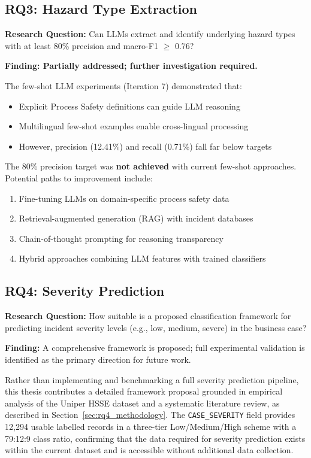 \documentclass[11pt, titlepage, bibliography=totoc]{scrreprt}
\begin{document}
\subsection{RQ3: Hazard Type Extraction}

\textbf{Research Question:} Can LLMs extract and identify underlying hazard types with at least 80\% precision and macro-F1 $\geq$ 0.76?

\textbf{Finding: Partially addressed; further investigation required.}

The few-shot LLM experiments (Iteration 7) demonstrated that:
\begin{itemize}
    \item Explicit Process Safety definitions can guide LLM reasoning
    \item Multilingual few-shot examples enable cross-lingual processing
    \item However, precision (12.41\%) and recall (0.71\%) fall far below targets
\end{itemize}

The 80\% precision target was \textbf{not achieved} with current few-shot approaches. Potential paths to improvement include:
\begin{enumerate}
    \item Fine-tuning LLMs on domain-specific process safety data
    \item Retrieval-augmented generation (RAG) with incident databases
    \item Chain-of-thought prompting for reasoning transparency
    \item Hybrid approaches combining LLM features with trained classifiers
\end{enumerate}

\subsection{RQ4: Severity Prediction}

\textbf{Research Question:} How suitable is a proposed classification framework for predicting incident severity levels (e.g., low, medium, severe) in the business case?

\textbf{Finding:} A comprehensive framework is proposed; full experimental validation is identified as the primary direction for future work.

Rather than implementing and benchmarking a full severity prediction pipeline, this thesis contributes a detailed framework proposal grounded in empirical analysis of the Uniper HSSE dataset and a systematic literature review, as described in Section~\ref{sec:rq4_methodology}. The \texttt{CASE\_SEVERITY} field provides 12{,}294 usable labelled records in a three-tier Low/Medium/High scheme with a 79:12:9 class ratio, confirming that the data required for severity prediction exists within the current dataset and is accessible without additional data collection.
\end{document}
